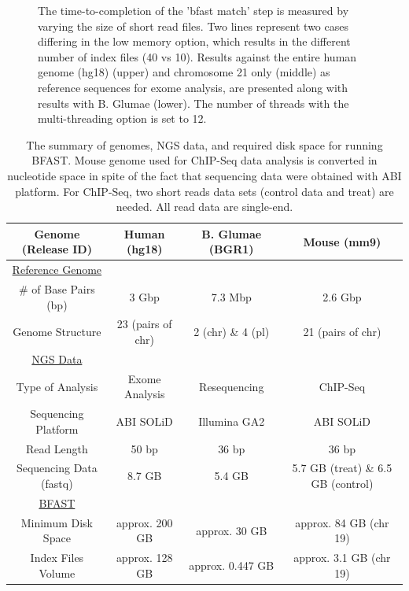 \documentclass{cpeauth}
\begin{document}
\begin{figure}
\caption{\small The time-to-completion of the 'bfast match' step is
  measured by varying the size of short read files.  Two lines
  represent two cases differing in the low memory option, which
  results in the different number of index files (40 vs 10).  Results against the entire human genome (hg18) (upper) and chromosome 21 only (middle) as reference sequences for exome analysis, are presented along with results with B. Glumae (lower).  The number of threads with the multi-threading option is set to 12.}
  \label{fig:parallel-execution} 
 \end{figure}




\begin{table}
\small
\begin{tabular}{|c|c|c|c|} 
  \hline 
Genome (Release ID)   & Human (hg18) & B. Glumae (BGR1) & Mouse (mm9)  \\    
   
\hline \hline
\underline{Reference Genome} & & & \\
    \# of Base Pairs (bp) &  3 Gbp & 7.3 Mbp & 2.6 Gbp\\ 
   Genome Structure &   23 (pairs of chr)  & 2 (chr) \& 4 (pl) & 21 (pairs of chr)   \\   
 
      \hline \hline
  \underline{NGS Data} & &   & \\
      Type of  Analysis &  Exome Analysis &  Resequencing & ChIP-Seq\\ 
  
          Sequencing Platform & ABI SOLiD  &  Illumina GA2 & ABI SOLiD \\ 
          Read Length & 50 bp & 36 bp & 36 bp \\

  Sequencing Data (fastq)  & 8.7 GB & 5.4 GB & 5.7 GB (treat) \& 6.5 GB (control) \\
  
  
  \hline  \hline
  \underline{BFAST} & &  & \\
  Minimum Disk Space &  approx. 200 GB   &    approx. 30 GB  &  approx. 84 GB (chr 19)\\
   Index Files Volume  & approx. 128 GB  & approx. 0.447 GB  & approx. 3.1 GB (chr 19)\\ 
\hline  \hline
\end{tabular} \caption{The summary of genomes, NGS data, and required disk space for running BFAST.  Mouse genome used for ChIP-Seq data analysis is converted in nucleotide space in spite of the fact that sequencing data were obtained with ABI platform.  For ChIP-Seq, two short reads data sets (control data and treat) are needed.  All read data are single-end.}
 \label{table:two-genomes} 
\end{table}
\end{document}
